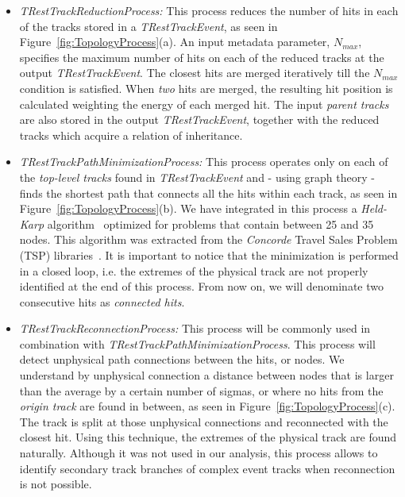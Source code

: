 \begin{itemize}

	\item \emph{TRestTrackReductionProcess:} This process reduces the number of hits in each of the tracks stored in a \emph{TRestTrackEvent}, as seen in Figure~\ref{fig:TopologyProcess}(a). An input metadata parameter, $N_{max}$, specifies the maximum number of hits on each of the reduced tracks at the output \emph{TRestTrackEvent}. The closest hits are merged iteratively till the $N_{max}$ condition is satisfied. When \emph{two} hits are merged, the resulting hit position is calculated weighting the energy of each merged hit. The input \emph{parent tracks} are also stored in the output \emph{TRestTrackEvent}, together with the reduced tracks which acquire a relation of inheritance.

	\item \emph{TRestTrackPathMinimizationProcess:} This process operates only on each of the \emph{top-level tracks} found in \emph{TRestTrackEvent} and - using graph theory - finds the shortest path that connects all the hits within each track, as seen in Figure~\ref{fig:TopologyProcess}(b). We have integrated in this process a \emph{Held-Karp} algorithm~\cite{held1962dynamic} optimized for problems that contain between 25 and 35 nodes. This algorithm was extracted from the \emph{Concorde} Travel Sales Problem (TSP) libraries~\cite{Applegate:2007:TSP:1374811,concorde}. It is important to notice that the minimization is performed in a closed loop, i.e. the extremes of the physical track are not properly identified at the end of this process. From now on, we will denominate two consecutive hits as \emph{connected hits}.

	\item \emph{TRestTrackReconnectionProcess:} This process will be commonly used in combination with \emph{TRestTrackPathMinimizationProcess}. This process will detect unphysical path connections between the hits, or nodes. We understand by unphysical connection a distance between nodes that is larger than the average by a certain number of sigmas, or where no hits from the \emph{origin track} are found in between, as seen in Figure~\ref{fig:TopologyProcess}(c). The track is split at those unphysical connections and reconnected with the closest hit. Using this technique, the extremes of the physical track are found naturally. Although it was not used in our analysis, this process allows to identify secondary track branches of complex event tracks when reconnection is not possible.

\end{itemize}

